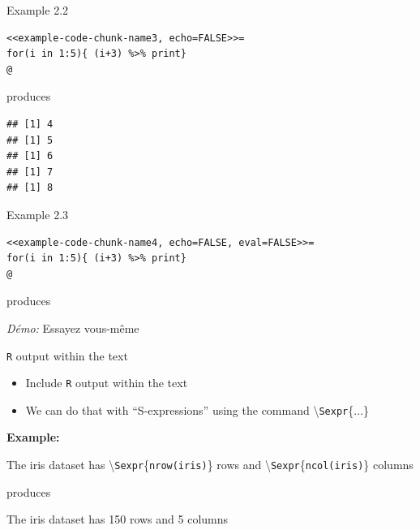 \documentclass[10pt]{beamer}\usepackage[]{graphicx}\usepackage[]{color}
\makeatletter
\newenvironment{kframe}{%
 \def\at@end@of@kframe{}%
 \ifinner\ifhmode%
  \def\at@end@of@kframe{\end{minipage}}%
  \begin{minipage}{\columnwidth}%
 \fi\fi%
 \def\FrameCommand##1{\hskip\@totalleftmargin \hskip-\fboxsep
 \colorbox{shadecolor}{##1}\hskip-\fboxsep
     \hskip-\linewidth \hskip-\@totalleftmargin \hskip\columnwidth}%
 \MakeFramed {\advance\hsize-\width
   \@totalleftmargin\z@ \linewidth\hsize
   \@setminipage}}%
 {\par\unskip\endMakeFramed%
 \at@end@of@kframe}
\newenvironment{knitrout}{}{} %
\makeatother
\begin{document}
\begin{frame}[fragile]{Example 2.2}
\begin{knitrout}\footnotesize
{}\color{fgcolor}\begin{kframe}
\begin{verbatim}
<<example-code-chunk-name3, echo=FALSE>>=
for(i in 1:5){ (i+3) %>% print}
@
\end{verbatim}
\end{kframe}
\end{knitrout}
produces
\begin{knitrout}\footnotesize
{}\color{fgcolor}\begin{kframe}
\begin{verbatim}
## [1] 4
## [1] 5
## [1] 6
## [1] 7
## [1] 8
\end{verbatim}
\end{kframe}
\end{knitrout}

\end{frame}


\begin{frame}[fragile]{Example 2.3}
\begin{knitrout}\footnotesize
{}\color{fgcolor}\begin{kframe}
\begin{verbatim}
<<example-code-chunk-name4, echo=FALSE, eval=FALSE>>=
for(i in 1:5){ (i+3) %>% print}
@
\end{verbatim}
\end{kframe}
\end{knitrout}
produces


\textit{Démo:} Essayez vous-même
\end{frame}



\begin{frame}[fragile]{\texttt{R} output within the text}
\begin{itemize}
\item Include \texttt{R} output within the text
\item We can do that with ``S-expressions'' using the command \textbackslash \texttt{Sexpr}\{$\ldots$\}
\end{itemize}
\vspace{1cm}

\textbf{Example:} \vspace{0.3cm}

The iris dataset has \textbackslash \texttt{Sexpr}\{\texttt{nrow(iris)}\} rows and \textbackslash \texttt{Sexpr}\{\texttt{ncol(iris)}\} columns
\vspace{0.5cm}

produces \vspace{0.5cm}

The iris dataset has 150 rows and 5 columns


\end{frame}
\end{document}
